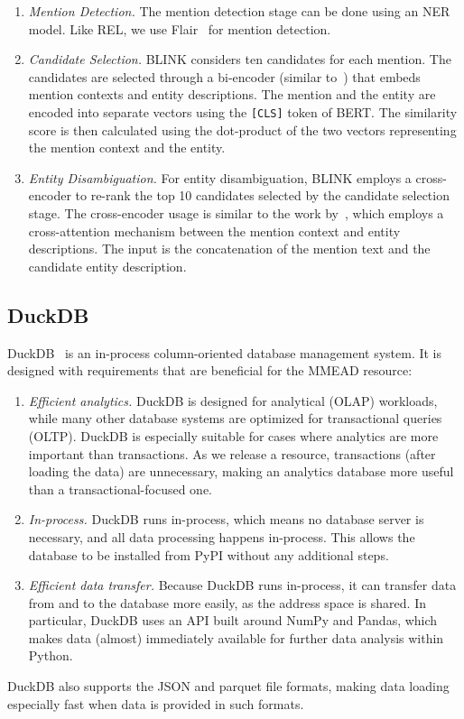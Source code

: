 \begin{enumerate}
    \item \emph{Mention Detection.} The mention detection stage can be done using an NER model. Like REL, we use Flair~\citep{flair} for mention detection.
	\item \emph{Candidate Selection.} BLINK considers ten candidates for each mention. The candidates are selected through a bi-encoder (similar to~\citet{poly-encoders}) that embeds mention contexts and entity descriptions. The mention and the entity are encoded into separate vectors using the \texttt{[CLS]} token of BERT. The similarity score is then calculated using the dot-product of the two vectors representing the mention context and the entity.  
	\item \emph{Entity Disambiguation.} For entity disambiguation, BLINK employs a cross-encoder to re-rank the top 10 candidates selected by the candidate selection stage. The cross-encoder usage is similar to the work by~\citet{poly-encoders}, which employs a cross-attention mechanism between the mention context and entity descriptions. The input is the concatenation of the mention text and the candidate entity description.    
\end{enumerate}

\subsection{DuckDB}
DuckDB~\citep{duckdb} is an in-process column-oriented database management system. It is designed with requirements that are beneficial for the MMEAD resource:
\begin{enumerate}
    \item \emph{Efficient analytics.} DuckDB is designed for analytical (OLAP) workloads, while many other database systems are optimized for transactional queries (OLTP). DuckDB is especially suitable for cases where analytics are more important than transactions. As we release a resource, transactions (after loading the data) are unnecessary, making an analytics database more useful than a transactional-focused one.  
	\item \emph{In-process.} DuckDB runs in-process, which means no database server is necessary, and all data processing happens in-process. This allows the database to be installed from PyPI without any additional steps. 
	\item \emph{Efficient data transfer.} Because DuckDB runs in-process, it can transfer data from and to the database more easily, as the address space is shared. In particular, DuckDB uses an API built around NumPy and Pandas, which makes data (almost) immediately available for further data analysis within Python. 
\end{enumerate}
DuckDB also supports the JSON and parquet file formats, making data loading especially fast when data is provided in such formats.

